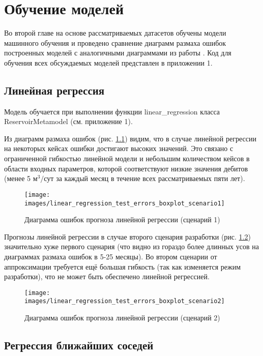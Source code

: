 \chapter{Обучение моделей} \label{ch2}
Во второй главе на основе рассматриваемых датасетов обучены модели машинного обучения и проведено сравнение диаграмм размаха ошибок построенных моделей с аналогичными диаграммами из работы \cite{muravtsev:metamodel}. Код для обучения всех обсуждаемых моделей представлен в приложении 1.

\section{Линейная регрессия} \label{ch1:sec1}

Модель обучается при выполнении функции linear\_regression класса ReservoirMetamodel (см. приложение 1).

Из диаграмм размаха ошибок (рис. \ref{fig:lin-reg-1}) видим, что в случае линейной регрессии на некоторых кейсах ошибки достигают высоких значений. Это связано с ограниченной гибкостью линейной модели и небольшим количеством кейсов в области входных параметров, которой соответствуют низкие значения дебитов (менее 5 $\text{м}^3/\text{сут}$ за каждый месяц в течение всех рассматриваемых пяти лет).

\begin{figure}[H] 
	\center
	\texttt{[image: images/linear\_regression\_test\_errors\_boxplot\_scenario1]}
	\caption{Диаграмма ошибок прогноза линейной регрессии (сценарий 1)} 
	\label{fig:lin-reg-1}
\end{figure}

Прогнозы линейной регрессии в случае второго сценария разработки (рис. \ref{fig:lin-reg-2}) значительно хуже первого сценария (что видно из гораздо более длинных усов на диаграммах размаха ошибок в 5-25 месяцы). Во втором сценарии от аппроксимации требуется ещё большая гибкость (так как изменяется режим разработки), что не может быть обеспечено линейной регрессией.

\begin{figure}[H] 
	\center
	\texttt{[image: images/linear\_regression\_test\_errors\_boxplot\_scenario2]}
	\caption{Диаграмма ошибок прогноза линейной регрессии (сценарий 2)} 
	\label{fig:lin-reg-2}
\end{figure}


\section{Регрессия ближайших соседей} \label{ch1:sec2}

